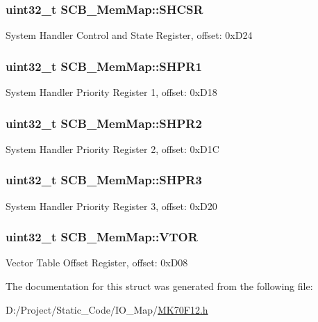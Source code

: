 \subsubsection[{S\+H\+C\+S\+R}]{\setlength{\rightskip}{0pt plus 5cm}uint32\+\_\+t S\+C\+B\+\_\+\+Mem\+Map\+::\+S\+H\+C\+S\+R}\label{struct_s_c_b___mem_map_ae2b73d4b9744b878527466ec57dbfdb7}
System Handler Control and State Register, offset\+: 0x\+D24 \hypertarget{struct_s_c_b___mem_map_afe02d5ca0102ec35b79172d453854ed0}{}
\subsubsection[{S\+H\+P\+R1}]{\setlength{\rightskip}{0pt plus 5cm}uint32\+\_\+t S\+C\+B\+\_\+\+Mem\+Map\+::\+S\+H\+P\+R1}\label{struct_s_c_b___mem_map_afe02d5ca0102ec35b79172d453854ed0}
System Handler Priority Register 1, offset\+: 0x\+D18 \hypertarget{struct_s_c_b___mem_map_a1636322022eb10e4acedf40018708b68}{}
\subsubsection[{S\+H\+P\+R2}]{\setlength{\rightskip}{0pt plus 5cm}uint32\+\_\+t S\+C\+B\+\_\+\+Mem\+Map\+::\+S\+H\+P\+R2}\label{struct_s_c_b___mem_map_a1636322022eb10e4acedf40018708b68}
System Handler Priority Register 2, offset\+: 0x\+D1\+C \hypertarget{struct_s_c_b___mem_map_a8ac3a3b8dd23fb279640b98a95fb796a}{}
\subsubsection[{S\+H\+P\+R3}]{\setlength{\rightskip}{0pt plus 5cm}uint32\+\_\+t S\+C\+B\+\_\+\+Mem\+Map\+::\+S\+H\+P\+R3}\label{struct_s_c_b___mem_map_a8ac3a3b8dd23fb279640b98a95fb796a}
System Handler Priority Register 3, offset\+: 0x\+D20 \hypertarget{struct_s_c_b___mem_map_aa327db1d9948595498fba43acc8d336b}{}
\subsubsection[{V\+T\+O\+R}]{\setlength{\rightskip}{0pt plus 5cm}uint32\+\_\+t S\+C\+B\+\_\+\+Mem\+Map\+::\+V\+T\+O\+R}\label{struct_s_c_b___mem_map_aa327db1d9948595498fba43acc8d336b}
Vector Table Offset Register, offset\+: 0x\+D08 

The documentation for this struct was generated from the following file\+:\begin{DoxyCompactItemize}
\item 
D\+:/\+Project/\+Static\+\_\+\+Code/\+I\+O\+\_\+\+Map/\hyperlink{_m_k70_f12_8h}{M\+K70\+F12.\+h}\end{DoxyCompactItemize}
